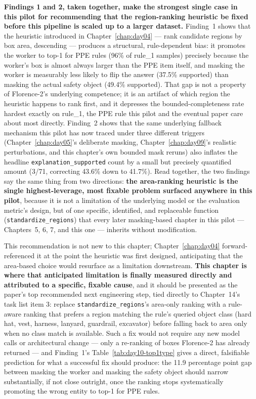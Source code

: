 \textbf{Findings 1 and 2, taken together, make the strongest single case in this pilot for recommending
that the region-ranking heuristic be fixed before this pipeline is scaled up to a larger dataset.}
Finding~1 shows that the heuristic introduced in Chapter~\ref{chap:day04} --- rank candidate regions by
box area, descending --- produces a structural, rule-dependent bias: it promotes the worker to top-1 for
PPE rules (96\% of rule\_1 samples) precisely because the worker's box is almost always larger than the
PPE item itself, and masking the worker is measurably less likely to flip the answer (37.5\% supported)
than masking the actual safety object (49.4\% supported). That gap is not a property of Florence-2's
underlying competence; it is an artifact of which region the heuristic happens to rank first, and it
depresses the bounded-completeness rate hardest exactly on rule\_1, the PPE rule this pilot and the
eventual paper care about most directly. Finding~2 shows that the same underlying fallback mechanism
this pilot has now traced under three different triggers (Chapter~\ref{chap:day05}'s deliberate masking,
Chapter~\ref{chap:day09}'s realistic perturbations, and this chapter's own bounded mask reruns) also
inflates the headline \texttt{explanation\_supported} count by a small but precisely quantified amount
(3/71, correcting 43.6\% down to 41.7\%). Read together, the two findings say the same thing from two
directions: \textbf{the area-ranking heuristic is the single highest-leverage, most fixable problem
surfaced anywhere in this pilot}, because it is not a limitation of the underlying model or the
evaluation metric's design, but of one specific, identified, and replaceable function
(\texttt{standardize\_regions}) that every later masking-based chapter in this pilot --- Chapters~5, 6,
7, and this one --- inherits without modification.

This recommendation is not new to this chapter; Chapter~\ref{chap:day04} forward-referenced it at the
point the heuristic was first designed, anticipating that the area-based choice would resurface as a
limitation downstream. \textbf{This chapter is where that anticipated limitation is finally measured
directly and attributed to a specific, fixable cause}, and it should be presented as the paper's top
recommended next engineering step, tied directly to Chapter~14's task list item 3: replace
\texttt{standardize\_regions}'s area-only ranking with a rule-aware ranking that prefers a region
matching the rule's queried object class (hard hat, vest, harness, lanyard, guardrail, excavator) before
falling back to area only when no class match is available. Such a fix would not require any new model
calls or architectural change --- only a re-ranking of boxes Florence-2 has already returned --- and
Finding~1's Table~\ref{tab:day10-top1type} gives a direct, falsifiable prediction for what a successful
fix should produce: the 11.9 percentage point gap between masking the worker and masking the safety
object should narrow substantially, if not close outright, once the ranking stops systematically
promoting the wrong entity to top-1 for PPE rules.

